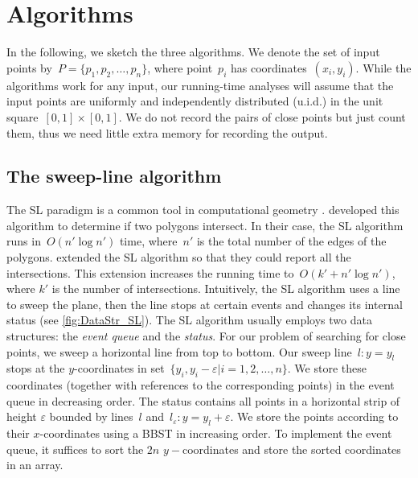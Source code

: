 \section{Algorithms}
\label{sec:DataStr_Algorithms}

In the following, we sketch the three algorithms. 
We denote the set of input points 
by~$P=\{p_{1},p_{2},\ldots , p_{n}\}$,
where point~$p_{i}$ has coordinates~$(x_{i},y_{i})$. 
While the algorithms work for any input, 
our running-time analyses will assume 
that the input points are 
uniformly and independently distributed (u.i.d.) 
in the unit square~$[0,1]\times [0,1]$. 
We do not record the pairs of close points 
but just count them, 
thus we need little extra memory for recording the output.



\subsection{The sweep-line algorithm}
\label{sec:DataStr_SLAlgorithm}



The SL paradigm is a common tool in computational geometry
\parencite[]{deBerg2008}.
\textcite{Shamos1976} developed this algorithm to determine
if two polygons intersect.
In their case, the SL algorithm runs in~$O(n'\log n')$ time,
where~$n'$ is the total number of the edges of the polygons.
\textcite{Bentley1979} extended the SL algorithm so that 
they could report all the intersections.
This extension increases the running time 
to~$O(k' +n'\log n')$,
where $k'$ is the number of intersections. 
Intuitively, the SL algorithm uses a line to sweep the plane, 
then the line stops at certain events 
and changes its internal status
(see \fig\ref{fig:DataStr_SL}).
The SL algorithm usually employs two data structures: 
the \emph{event queue} and the \emph{status}. 
For our problem of searching for close points, 
we sweep a horizontal line from top to bottom. 
Our sweep line~$l: y=y_{l}$ stops at the $y$-coordinates 
in set~$\{ y_{i}, y_{i}-\varepsilon | i=1, 2, \ldots , n\}$.
We store these coordinates
(together with references to the corresponding points) 
in the event queue in decreasing order. 
The status contains all points in a 
horizontal strip of height $ \varepsilon$ 
bounded by lines~$l$ 
and~$l_{\varepsilon}: y=y_{l}+\varepsilon$. 
We store the points according to 
their $x$-coordinates using a BBST in increasing order. 
To implement the event queue, 
it suffices to sort the $2n$ $y-$coordinates 
and store the sorted coordinates in an array.

